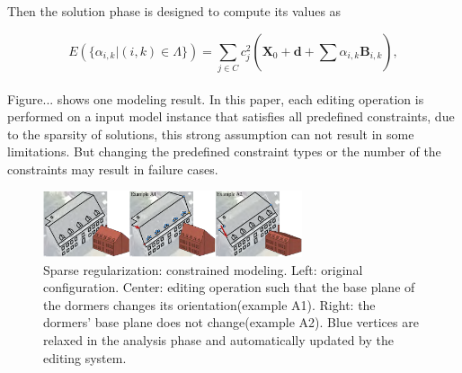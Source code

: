 Then the solution phase is designed to compute its values as

\small{
\begin{equation}
 \label{eq:ConstrainedModeling3}
 E(\{\alpha_{i,k}|(i,k)\in \Lambda\})=\sum_{j\in C}^{}c{_j^2}(\mathbf{X}_0+\mathbf{d}+\sum_{}^{}\alpha_{i,k}\mathbf{B}_{i,k}),
\end{equation}
}
\\
Figure... shows one modeling result. In this paper, each editing operation is performed on a input model instance that satisfies all predefined constraints, due to the sparsity of solutions, this strong assumption can not result in some limitations. But changing the predefined constraint types or the number of the constraints may result in failure cases.

\begin{figure}[ht]
  \centering
  \includegraphics[width=3in]{images/modeling_L0}
  \caption{Sparse regularization: constrained modeling\cite{habbecke2012linear}. Left: original configuration. Center: editing operation such that the base plane of the dormers changes its orientation(example A1). Right: the dormers' base plane does not change(example A2). Blue vertices are relaxed in the analysis phase and automatically updated by the editing system.}
\end{figure} 